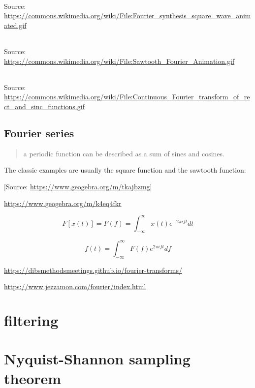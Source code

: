 \documentclass[
  letterpaper,
  DIV=11,
  numbers=noendperiod,
  oneside]{scrreprt}
\begin{document}
\strut \\
Source:
\url{https://commons.wikimedia.org/wiki/File:Fourier_synthesis_square_wave_animated.gif}

\strut \\
Source:
\url{https://commons.wikimedia.org/wiki/File:Sawtooth_Fourier_Animation.gif}

\strut \\
Source:
\url{https://commons.wikimedia.org/wiki/File:Continuous_Fourier_transform_of_rect_and_sinc_functions.gif}

\hypertarget{fourier-series}{%
\section{Fourier series}\label{fourier-series}}

\begin{quote}
a periodic function can be described as a sum of sines and cosines.
\end{quote}


The classic examples are usually the square function and the sawtooth
function:

{[}Source: \url{https://www.geogebra.org/m/tkajbzmg}{]}

\url{https://www.geogebra.org/m/k4eq4fkr}

\[
F[x(t)] = F(f) = \int_{-\infty}^{\infty}x(t)e^{-2\pi i f t}dt
\]

\[
f(t) = \int_{-\infty}^{\infty}F(f)e^{2\pi i f t}df
\]

\url{https://dibsmethodsmeetings.github.io/fourier-transforms/}

\url{https://www.jezzamon.com/fourier/index.html}

\hypertarget{filtering}{%
\chapter{filtering}\label{filtering}}

\hypertarget{nyquist-shannon-sampling-theorem}{%
\chapter{Nyquist-Shannon sampling
theorem}\label{nyquist-shannon-sampling-theorem}}
\end{document}

